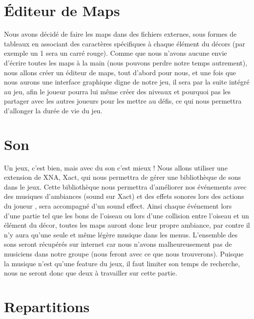 \documentclass [11pt]{report}
\begin{document}
	\section {\'Editeur de Maps}
		Nous avons décidé de faire les maps dans des fichiers externes, sous formes de tableaux en associant des caractères spécifiques à chaque élément du décors (par exemple un 1 sera un carré rouge). Comme que nous n'avons aucune envie d'écrire toutes les maps à la main (nous pouvons perdre notre temps autrement), nous 		allons créer un éditeur de maps, tout d'abord pour nous, et une fois que nous aurons une interface graphique digne de notre jeu, il sera par la suite intégré au jeu, afin le joueur pourra lui même créer des niveaux et pourquoi pas les partager avec les autres joueurs pour les mettre au défis, ce qui nous permettra d'allonger la durée de 		vie du jeu.\\\vspace{5mm}


\newpage
	\section {Son}
		Un jeux, c'est bien, mais avec du son c'est mieux ! Nous allons utiliser une extension de XNA, Xact, qui nous permettra de g\'erer une biblioth\`eque de sons dans le jeux. Cette biblioth\`eque nous permettra d'am\'eliorer nos \'ev\'enements avec des musiques d'ambiances (sound sur Xact) et des effets sonores lors des actions du 		joueur , sera accompagné d'un sound effect. Ainsi chaque événement lors d'une partie tel que les bons de l'oiseau ou lors d'une collision entre l'oiseau et un élément du décor, toutes les maps auront donc leur propre ambiance, par contre il n'y aura qu'une seule et même légère musique dans les menus. L'ensemble des sons seront récupérés sur internet car nous n'avons malheureusement pas de musiciens dans notre groupe (nous feront avec ce que nous trouverons). Puisque la musique n'est qu'une feature du jeux, il faut limiter son temps de recherche, nous ne seront donc que deux à travailler sur cette partie.\\\vspace{5mm}

	\section{Repartitions}
\end{document}
